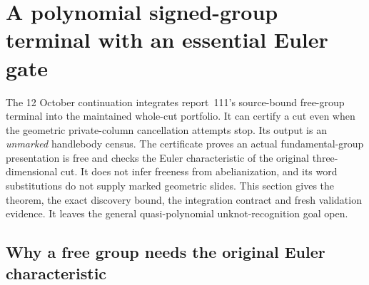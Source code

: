 \section{A polynomial signed-group terminal with an essential Euler gate}
\label{sec:euler-group-terminal}

The 12 October continuation integrates report~111's source-bound free-group
terminal into the maintained whole-cut portfolio.  It can certify a cut even
when the geometric private-column cancellation attempts stop.  Its output is
an \emph{unmarked} handlebody census.  The certificate proves an actual
fundamental-group presentation is free and checks the Euler characteristic
of the original three-dimensional cut.  It does not infer freeness from
abelianization, and its word substitutions do not supply marked geometric
slides.  This section gives the theorem, the exact discovery bound, the
integration contract and fresh validation evidence.  It leaves the general
quasi-polynomial unknot-recognition goal open.

\subsection{Why a free group needs the original Euler characteristic}

